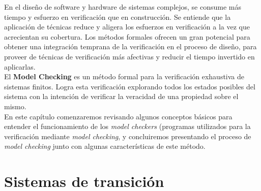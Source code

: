 \documentclass[titlepage, 12pt]{book}
\begin{document}
En el dise\~no de software y hardware de sistemas complejos, se consume m\'as tiempo y esfuerzo en verificaci\'on que en construcci\'on. Se entiende que la aplicaci\'on de t\'ecnicas reduce y aligera los esfuerzos en verificaci\'on a la vez que acrecientan su cobertura. Los m\'etodos formales ofrecen un gran potencial para obtener una integraci\'on temprana de la verificaci\'on en el proceso de dise\~no, para proveer de t\'ecnicas de verificaci\'on m\'as afectivas y reducir el tiempo invertido en aplicarlas\cite{prinMC}.\\

El \textbf{Model Checking} es un m\'etodo formal para la verificaci\'on exhaustiva de sistemas finitos. Logra esta verificaci\'on explorando todos los estados posibles del sistema con la intenci\'on de verificar la veracidad de una propiedad sobre el mismo.\\

En este cap\'itulo comenzaremos revisando algunos conceptos b\'asicos para entender el funcionamiento de los \textit{model checkers} (programas utilizados para la verificaci\'on mediante \textit{model checking}, y concluiremos presentando el proceso de \textit{model checking} junto con algunas caracter\'isticas de este m\'etodo.









\section{Sistemas de transici\'on}
\end{document}
